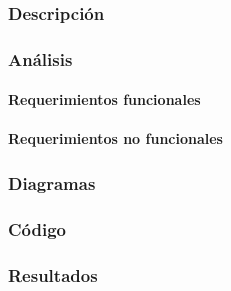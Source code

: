 \subsubsection{Descripción}

\subsubsection{Análisis}

\paragraph{Requerimientos funcionales}

\paragraph{Requerimientos no funcionales}

\newpage
\subsubsection{Diagramas}

\newpage
\subsubsection{Código}

\newpage
\subsubsection{Resultados}

\newpage